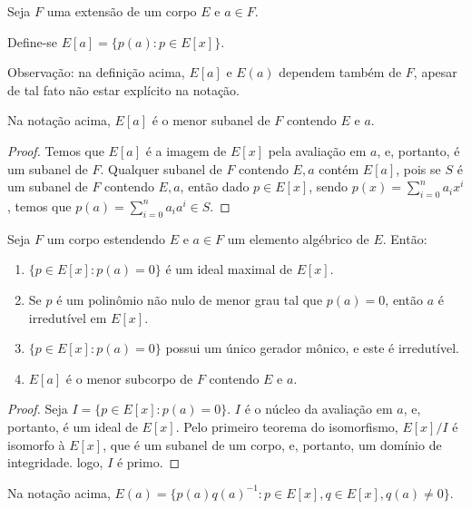 \begin{definition}
    Seja $F$ uma extensão de um corpo $E$ e $a \in F$.

    Define-se $E[a]=\{p(a): p \in E[x]\}$.
\end{definition}

Observação: na definição acima, $E[a]$ e $E(a)$ dependem também de $F$, apesar de tal fato não estar explícito na notação.
\begin{lemma}
    Na notação acima, $E[a]$ é o menor subanel de $F$ contendo $E$ e $a$.
\end{lemma}
\begin{proof}
    Temos que $E[a]$ é a imagem de $E[x]$ pela avaliação em $a$, e, portanto, é um subanel de $F$.
    Qualquer subanel de $F$ contendo $E, a$ contém $E[a]$, pois se $S$ é um subanel de $F$ contendo $E, a$, então dado $p\in E[x]$, sendo $p(x)=\sum_{i=0}^n a_ix^i$, temos que $p(a)=\sum_{i=0}^n a_i a^i \in S$.
\end{proof}
\begin{prop}
    Seja $F$ um corpo estendendo $E$ e $a\in F$ um elemento algébrico de $E$. Então:

    \begin{enumerate}
        \item $\{p \in E[x]: p(a)=0\}$ é um ideal maximal de $E[x]$.
        \item Se $p$ é um polinômio não nulo de menor grau tal que $p(a)=0$, então $a$ é irredutível em $E[x]$.
        \item $\{p \in E[x]: p(a)=0\}$ possui um único gerador mônico, e este é irredutível.
        \item $E[a]$ é o menor subcorpo de $F$ contendo $E$ e $a$.
    \end{enumerate}
\end{prop}
\begin{proof}
    Seja $I=\{p \in E[x]: p(a)=0\}$. $I$ é o núcleo da avaliação em $a$, e, portanto, é um ideal de $E[x]$.
    Pelo primeiro teorema do isomorfismo, $E[x]/I$ é isomorfo à $E[x]$, que é um subanel de um corpo, e, portanto, um domínio de integridade. logo, $I$ é primo.
\end{proof}
\begin{lemma}
    Na notação acima, $E(a)=\{p(a)q(a)^{-1}: p \in E[x], q \in E[x], q(a)\neq 0\}$.
\end{lemma}
